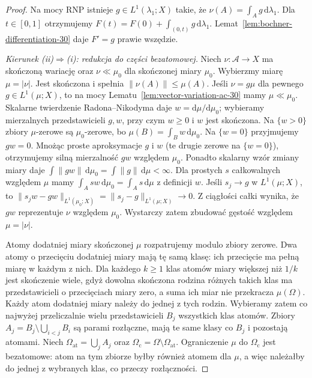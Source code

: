 \begin{proof}
Na mocy RNP istnieje $g\in L^1(\lambda_1;X)$ takie,
że $\nu(A)=\int_Ag\,\mathrm d\lambda_1$.
Dla $t\in[0,1]$ otrzymujemy
$F(t)=F(0)+\int_{(0,t)}g\,\mathrm d\lambda_1$.
Lemat~\ref{lem:bochner-differentiation-30} daje
$F'=g$ prawie wszędzie.

\emph{Kierunek (ii)$\Rightarrow$(i): redukcja do części bezatomowej.}
Niech $\nu:\mathcal A\to X$ ma skończoną wariację
oraz $\nu\ll\mu_0$ dla skończonej miary $\mu_0$.
Wybierzmy miarę $\mu=|\nu|$. Jest skończona i
spełnia $\|\nu(A)\|\le\mu(A)$.
Jeśli $\nu=g\mu$ dla pewnego $g\in L^1(\mu;X)$,
to na mocy Lematu~\ref{lem:vector-variation-ac-30}
mamy $\mu\ll\mu_0$. Skalarne twierdzenie
Radona--Nikodyma daje $w=\mathrm d\mu/\mathrm d\mu_0$;
wybieramy mierzalnych przedstawicieli $g,w$,
przy czym $w\ge0$ i $w$ jest skończona.
Na $\{w>0\}$ zbiory $\mu$-zerowe są $\mu_0$-zerowe,
bo $\mu(B)=\int_Bw\,\mathrm d\mu_0$. Na $\{w=0\}$
przyjmujemy $gw=0$. Mnożąc proste aproksymacje
$g$ i $w$ (te drugie zerowe na $\{w=0\}$), otrzymujemy
silną mierzalność $gw$ względem $\mu_0$.
Ponadto skalarny wzór zmiany miary daje
$\int\|gw\|\,\mathrm d\mu_0=\int\|g\|\,\mathrm d\mu<\infty$.
Dla prostych $s$ całkowalnych względem $\mu$ mamy
$\int_A sw\,\mathrm d\mu_0=\int_A s\,\mathrm d\mu$
z definicji $w$. Jeśli $s_j\to g$ w $L^1(\mu;X)$, to
$\|s_jw-gw\|_{L^1(\mu_0;X)}=\|s_j-g\|_{L^1(\mu;X)}\to0$.
Z ciągłości całki wynika, że $gw$ reprezentuje $\nu$
względem $\mu_0$. Wystarczy zatem zbudować
gęstość względem $\mu=|\nu|$.

Atomy dodatniej miary skończonej $\mu$ rozpatrujemy
modulo zbiory zerowe. Dwa atomy o przecięciu
dodatniej miary mają tę samą klasę: ich przecięcie
ma pełną miarę w każdym z nich. Dla każdego $k\ge1$
klas atomów miary większej niż $1/k$ jest skończenie
wiele, gdyż dowolna skończona rodzina różnych
takich klas ma przedstawicieli o przecięciach
miary zero, a suma ich miar nie przekracza
$\mu(\Omega)$. Każdy atom dodatniej miary należy
do jednej z tych rodzin. Wybieramy zatem co najwyżej
przeliczalnie wielu przedstawicieli $B_j$ wszystkich
klas atomów. Zbiory $A_j=B_j\setminus\bigcup_{i<j}B_i$
są parami rozłączne, mają te same klasy co $B_j$
i pozostają atomami.
Niech $\Omega_{\mathrm{at}}=\bigcup_j A_j$ oraz
$\Omega_{\mathrm{c}}=\Omega\setminus\Omega_{\mathrm{at}}$.
Ograniczenie $\mu$ do $\Omega_{\mathrm{c}}$ jest
bezatomowe: atom na tym zbiorze byłby również
atomem dla $\mu$, a więc należałby do jednej
z wybranych klas, co przeczy rozłączności.


\end{proof}
